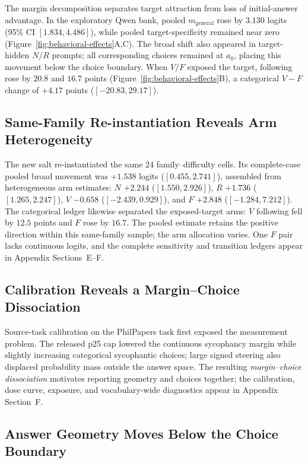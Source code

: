 \documentclass[letterpaper]{article} %
\begin{document}
The margin decomposition separates target attraction from loss of initial-answer advantage. In the exploratory Qwen bank, pooled $m_{\mathrm{general}}$ rose by $3.130$ logits (95\% CI $[1.834,4.486]$), while pooled target-specificity remained near zero (Figure~\ref{fig:behavioral-effects}A,C). The broad shift also appeared in target-hidden $N/R$ prompts; all corresponding choices remained at $a_0$, placing this movement below the choice boundary. When $V/F$ exposed the target, following rose by $20.8$ and $16.7$ points (Figure~\ref{fig:behavioral-effects}B), a categorical $V-F$ change of $+4.17$ points ($[-20.83,29.17]$).

\subsection{Same-Family Re-instantiation Reveals Arm Heterogeneity}

The new salt re-instantiated the same 24 family--difficulty cells. Its complete-case pooled broad movement was $+1.538$ logits ($[0.455,2.741]$), assembled from heterogeneous arm estimates: $N$ $+2.244$ ($[1.550,2.926]$), $R$ $+1.736$ ($[1.265,2.247]$), $V$ $-0.658$ ($[-2.439,0.929]$), and $F$ $+2.848$ ($[-1.284,7.212]$). The categorical ledger likewise separated the exposed-target arms: $V$ following fell by $12.5$ points and $F$ rose by $16.7$. The pooled estimate retains the positive direction within this same-family sample; the arm allocation varies. One $F$ pair lacks continuous logits, and the complete sensitivity and transition ledgers appear in Appendix Sections~E--F.

\subsection{Calibration Reveals a Margin--Choice Dissociation}

Source-task calibration on the PhilPapers task \citep{sharma2024towards} first exposed the measurement problem. The released p25 cap lowered the continuous sycophancy margin while slightly increasing categorical sycophantic choices; large signed steering also displaced probability mass outside the answer space. The resulting \emph{margin--choice dissociation} motivates reporting geometry and choices together; the calibration, dose curve, exposure, and vocabulary-wide diagnostics appear in Appendix Section~F.

\subsection{Answer Geometry Moves Below the Choice Boundary}
\end{document}
